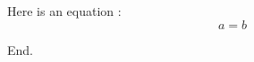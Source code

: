 \documentclass[a4paper,oneside,11pt]{book}
\begin{document}
 
    Here is an equation :
    \[
    a=b  
    \]

    End.
\end{document}
